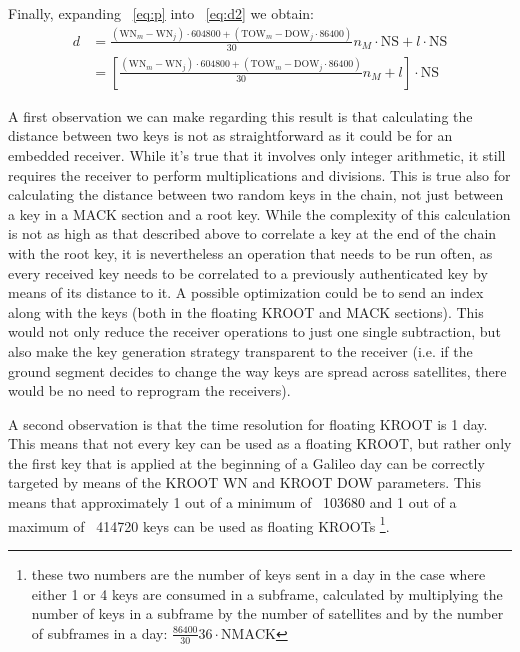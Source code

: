 Finally, expanding ~\ref{eq:p} into ~\ref{eq:d2} we obtain:
\begin{equation}
  \begin{aligned}
    d &= \frac{(\textrm{WN}_m - \textrm{WN}_j) \cdot 604800 + (\textrm{TOW}_m -
    \textrm{DOW}_j \cdot 86400)}{30} n_M \cdot \textrm{NS} + l \cdot \textrm{NS} \\
    &= \left[\frac{(\textrm{WN}_m - \textrm{WN}_j) \cdot 604800 + (\textrm{TOW}_m -
    \textrm{DOW}_j \cdot 86400)}{30} n_M  + l\right] \cdot \textrm{NS}
  \end{aligned}
\end{equation}

A first observation we can make regarding this result is that calculating the
distance between two keys is not as straightforward as it could be for an
embedded receiver. While it's true that it involves only integer arithmetic, it
still requires the receiver to perform multiplications and divisions. This is
true also for calculating the distance between two random keys in the chain, not
just between a key in a MACK section and a root key. While the complexity of
this calculation is not as high as that described above to correlate a key at
the end of the chain with the root key, it is nevertheless an operation that
needs to be run often, as every received key needs to be correlated to a
previously authenticated key by means of its distance to it. A possible
optimization could be to send an index along with the keys (both in the floating
KROOT and MACK sections). This would not only reduce the receiver operations to
just one single subtraction, but also make the key generation strategy
transparent to the receiver (i.e. if the ground segment decides to change the
way keys are spread across satellites, there would be no need to reprogram the
receivers).

A second observation is that the time resolution for floating KROOT is 1
day. This means that not every key can be used as a floating KROOT, but rather
only the first key that is applied at the beginning of a Galileo day can be
correctly targeted by means of the KROOT WN and KROOT DOW parameters. This means
that approximately 1 out of a minimum of ~103680 and 1 out of a maximum of
~414720 keys can be used as floating KROOTs \footnote{these two numbers are the number of
keys sent in a day in the case where either 1 or 4 keys are consumed in a
subframe, calculated by multiplying the number of keys in a subframe by the
number of satellites and by the number of subframes in a day:
$\frac{86400}{30}36 \cdot \textrm{NMACK}$}.

